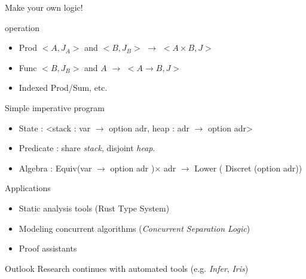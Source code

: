 \documentclass{beamer}
\begin{document}
\begin{frame}{Make your own logic!}
   \begin{block}{operation}
      \begin{itemize}
         \item Prod $<A, J_A>$ and $<B, J_B>$ $\to$ $<A\times B, J>$
         \item Func $<B, J_B>$ and $A$ $\to$ $<A\to B, J>$
         \item Indexed Prod/Sum, etc.
      \end{itemize}
   \end{block}
   \begin{block}{Simple imperative program}
      \begin{itemize}
         \item State : <stack : var $\to$ option adr, heap : adr $\to$ option adr>
         \item Predicate : share \emph{stack}, disjoint \emph{heap}.
         \item Algebra :  Equiv(var $\to$ option adr )$\times $ adr $\to $ Lower ( Discret (option adr))
      \end{itemize}
   \end{block}
\end{frame}



\begin{frame}{Applications}
   \begin{itemize}
      \item Static analysis tools (Rust Type System)
      \item Modeling concurrent algorithms (\emph{Concurrent Separation Logic})
      \item Proof assistants
   \end{itemize}
   \vspace{0.5em}
   \pause
   \begin{block}{Outlook}
      Research continues with automated tools (e.g. \emph{Infer}, \emph{Iris})
   \end{block}
\end{frame}
\end{document}
